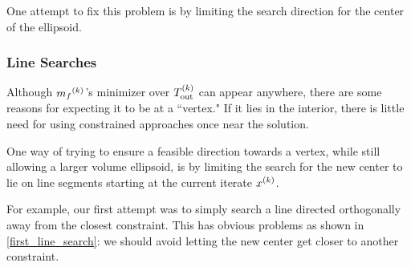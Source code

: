 One attempt to fix this problem is by limiting the search direction for the center of the ellipsoid.


\subsubsection{Line Searches}
Although ${{m}_f}^{(k)}$'s minimizer over ${T_{\text{out}}^{(k)}}$  can appear anywhere, there are some reasons for expecting it to be at a ``vertex."
If it lies in the interior, there is little need for using constrained approaches once near the solution.

One way of trying to ensure a feasible direction towards a vertex, while still allowing a larger volume ellipsoid, is by limiting the search for the new center to lie on line segments starting at the current iterate $x^{(k)}$.

For example, our first attempt was to simply search a line directed orthogonally away from the closest constraint.
This has obvious problems as shown in \cref{first_line_search}: we should avoid letting the new center get closer to another constraint.

